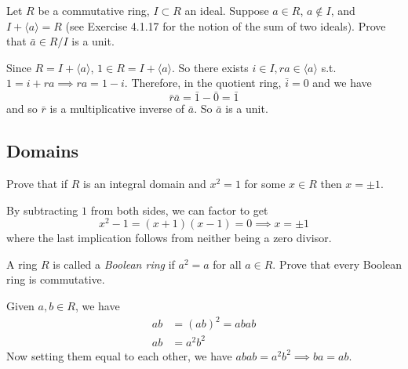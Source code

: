   \begin{exercise}[Shifrin 4.2.12]
    Let $R$ be a commutative ring, $I \subset R$ an ideal. Suppose $a \in R$, $a \notin I$, and $I + \langle a \rangle = R$ (see Exercise 4.1.17 for the notion of the sum of two ideals). Prove that $\bar{a} \in R/I$ is a unit.
  \end{exercise}
  \begin{solution}
    Since $R = I + \langle a \rangle$, $1 \in R = I + \langle a \rangle$. So there exists $i \in I, ra \in \langle a \rangle$ s.t. $1 = i + ra \implies ra = 1 - i$. Therefore, in the quotient ring, $\bar{i} = 0$ and we have 
    \begin{equation}
      \bar{r} \bar{a} = \bar{1} - \bar{0} = \bar{1}
    \end{equation}
    and so $\bar{r}$ is a multiplicative inverse of $\bar{a}$. So $\bar{a}$ is a unit. 
  \end{solution}

\subsection{Domains}

  \begin{exercise}[Dummit 7.1.11]
    Prove that if $R$ is an integral domain and $x^2 = 1$ for some $x \in R$ then $x = \pm 1$. 
  \end{exercise}
  \begin{solution}
    By subtracting $1$ from both sides, we can factor to get 
    \begin{equation}
      x^2 - 1 = (x + 1) (x - 1) = 0 \implies x = \pm 1
    \end{equation}
    where the last implication follows from neither being a zero divisor. 
  \end{solution}

  \begin{exercise}[Dummit 7.1.15]
    A ring $R$ is called a \textit{Boolean ring} if $a^2 = a$ for all $a \in R$. Prove that every Boolean ring is commutative. 
  \end{exercise}
  \begin{solution}
    Given $a, b \in R$, we have 
    \begin{align}
      ab & = (ab)^2 = abab \\ 
      ab & = a^2 b^2 
    \end{align}
    Now setting them equal to each other, we have $abab = a^2 b^2 \implies ba = ab$. 
  \end{solution}

